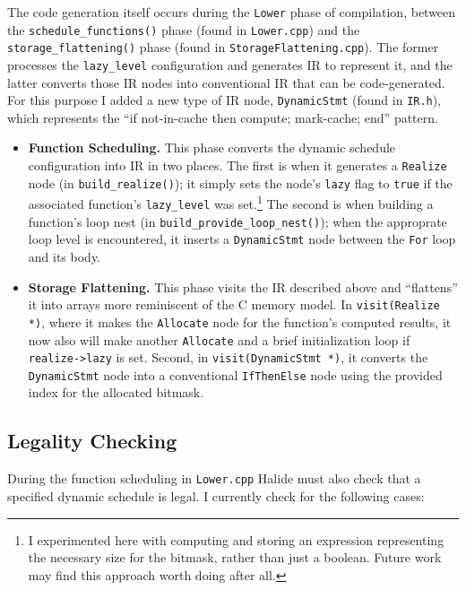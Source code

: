 \documentclass{article}
\begin{document}
The code generation itself occurs during the \texttt{Lower} phase of compilation, between the \texttt{schedule\_functions()} phase (found in \texttt{Lower.cpp}) and the \texttt{storage\_flattening()} phase (found in \texttt{StorageFlattening.cpp}). The former processes the \texttt{lazy\_level} configuration and generates IR to represent it, and the latter converts those IR nodes into conventional IR that can be code-generated. For this purpose I added a new type of IR node, \texttt{DynamicStmt} (found in \texttt{IR.h}), which represents the ``if not-in-cache then compute; mark-cache; end'' pattern.

\begin{itemize}
	\item {\bf Function Scheduling.} This phase converts the dynamic schedule configuration into IR in two places. The first is when it generates a \texttt{Realize} node (in \texttt{build\_realize()}); it simply sets the node's \texttt{lazy} flag to \texttt{true} if the associated function's \texttt{lazy\_level} was set.\footnote{
	I experimented here with computing and storing an expression representing the necessary size for the bitmask, rather than just a boolean. Future work may find this approach worth doing after all.}
	The second is when building a function's loop nest (in \texttt{build\_provide\_loop\_nest()}); when the approprate loop level is encountered, it inserts a \texttt{DynamicStmt} node between the \texttt{For} loop and its body.
	\item {\bf Storage Flattening.} This phase visits the IR described above and ``flattens'' it into arrays more reminiscent of the C memory model. In \texttt{visit(Realize *)}, where it makes the \texttt{Allocate} node for the function's computed results, it now also will make another \texttt{Allocate} and a brief initialization loop if \texttt{realize->lazy} is set. Second, in \texttt{visit(DynamicStmt *)}, it converts the \texttt{DynamicStmt} node into a conventional \texttt{IfThenElse} node using the provided index for the allocated bitmask.
\end{itemize}

\subsection{Legality Checking}

During the function scheduling in \texttt{Lower.cpp} Halide must also check that a specified dynamic schedule is legal. I currently check for the following cases:
\end{document}
